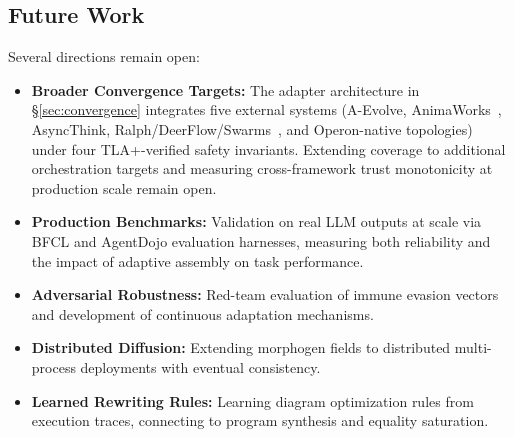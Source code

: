 \subsection*{Future Work}

Several directions remain open:
\begin{itemize}[leftmargin=*]
\item \textbf{Broader Convergence Targets:} The adapter architecture in \S\ref{sec:convergence} integrates five external systems (A-Evolve, AnimaWorks~\cite{animaworks}, AsyncThink, Ralph/DeerFlow/Swarms~\cite{swarms}, and Operon-native topologies) under four TLA+-verified safety invariants. Extending coverage to additional orchestration targets and measuring cross-framework trust monotonicity at production scale remain open.
\item \textbf{Production Benchmarks:} Validation on real LLM outputs at scale via BFCL and AgentDojo evaluation harnesses, measuring both reliability and the impact of adaptive assembly on task performance.
\item \textbf{Adversarial Robustness:} Red-team evaluation of immune evasion vectors and development of continuous adaptation mechanisms.
\item \textbf{Distributed Diffusion:} Extending morphogen fields to distributed multi-process deployments with eventual consistency.
\item \textbf{Learned Rewriting Rules:} Learning diagram optimization rules from execution traces, connecting to program synthesis and equality saturation.
\end{itemize}
